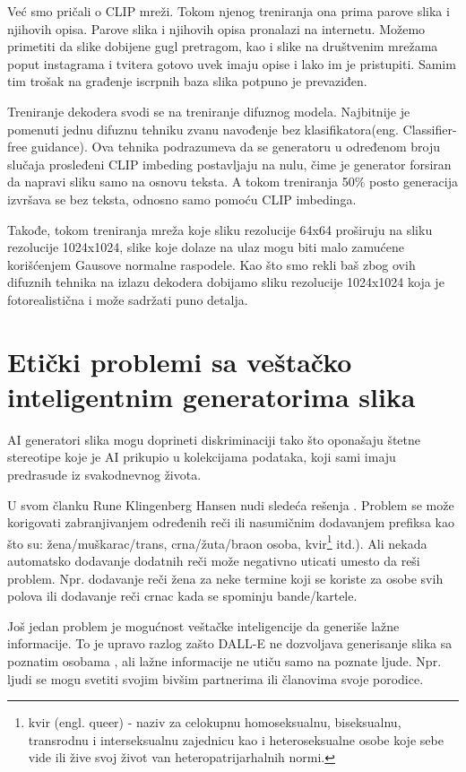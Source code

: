 \documentclass[12pt, letterpaper]{article}
\begin{document}
Već smo pričali o CLIP mreži. Tokom njenog treniranja ona prima parove slika i njihovih opisa. Parove slika i njihovih opisa pronalazi na internetu. Možemo primetiti da slike dobijene gugl pretragom, kao i slike na društvenim mrežama poput instagrama i tvitera gotovo uvek imaju opise i lako im je pristupiti. Samim tim trošak na građenje iscrpnih baza slika potpuno je prevaziđen.\cite{clip, openai_dali}

Treniranje dekodera svodi se na treniranje difuznog modela. Najbitnije je pomenuti jednu difuznu tehniku zvanu navođenje bez klasifikatora(eng. Classifier-free guidance). Ova tehnika podrazumeva da se generatoru u određenom broju slučaja prosleđeni CLIP imbeding postavljaju na nulu, čime je generator forsiran da napravi sliku samo na osnovu teksta. A tokom treniranja 50\% posto generacija izvršava se bez teksta, odnosno samo pomoću CLIP imbedinga.

Takođe, tokom treniranja mreža koje sliku rezolucije 64x64 proširuju na sliku rezolucije 1024x1024, slike koje dolaze na ulaz mogu biti malo zamućene korišćenjem Gausove normalne raspodele. Kao što smo rekli baš zbog ovih difuznih tehnika na izlazu dekodera dobijamo sliku rezolucije 1024x1024 koja je fotorealistična i može sadržati puno detalja.\cite{openai_dali}

\pagebreak
\section{Etički problemi sa veštačko inteligentnim generatorima slika}

AI generatori slika mogu doprineti diskriminaciji tako što oponašaju štetne stereotipe koje je AI prikupio u kolekcijama podataka, koji sami imaju predrasude iz svakodnevnog života.

U svom članku Rune Klingenberg Hansen nudi sledeća rešenja \cite{kljuc1}. Problem se može korigovati zabranjivanjem određenih reči ili nasumičnim dodavanjem prefiksa kao što su: žena/muškarac/trans, crna/žuta/braon osoba, kvir\footnote{kvir (engl. queer) - naziv za celokupnu homoseksualnu, biseksualnu, transrodnu i interseksualnu zajednicu kao i heteroseksualne osobe koje sebe vide ili žive svoj život van heteropatrijarhalnih normi.} itd.). Ali nekada automatsko dodavanje dodatnih reči može negativno uticati umesto da reši problem. Npr. dodavanje reči žena za neke termine koji se koriste za osobe svih polova ili dodavanje reči crnac kada se spominju bande/kartele.

Još jedan problem je mogućnost veštačke inteligencije da generiše lažne informacije. To je upravo razlog zašto DALL-E \cite{dalle} ne dozvoljava generisanje slika sa poznatim osobama \cite{poznate}, ali lažne informacije ne utiču samo na poznate ljude. Npr. ljudi se mogu svetiti svojim bivšim partnerima ili članovima svoje porodice.
\end{document}
